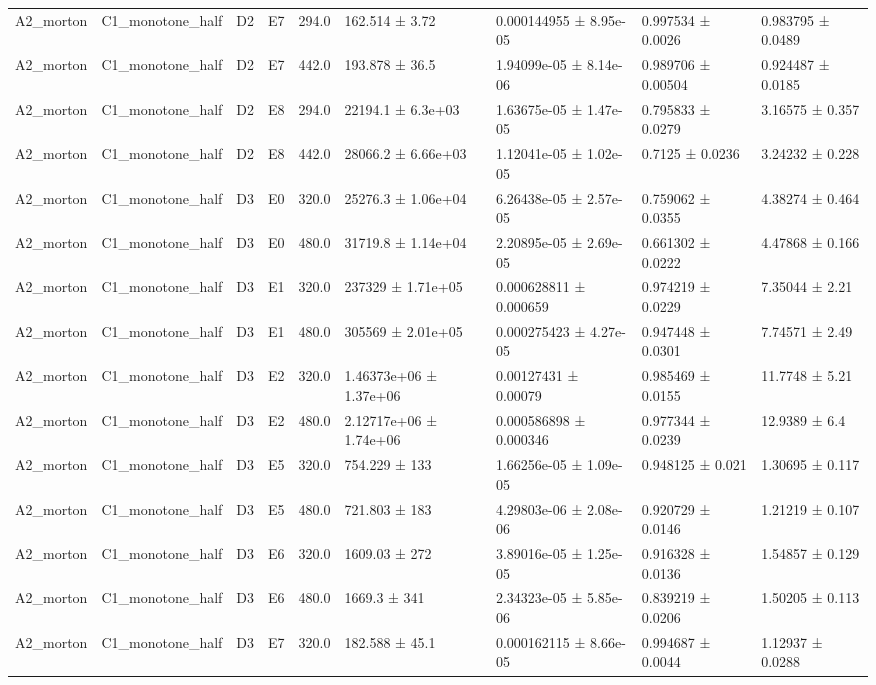 \begin{table}
\begin{tabular}{lllllllll}
A2\_morton & C1\_monotone\_half & D2 & E7 & 294.0 & 162.514 ± 3.72 & 0.000144955 ± 8.95e-05 & 0.997534 ± 0.0026 & 0.983795 ± 0.0489 \\
A2\_morton & C1\_monotone\_half & D2 & E7 & 442.0 & 193.878 ± 36.5 & 1.94099e-05 ± 8.14e-06 & 0.989706 ± 0.00504 & 0.924487 ± 0.0185 \\
A2\_morton & C1\_monotone\_half & D2 & E8 & 294.0 & 22194.1 ± 6.3e+03 & 1.63675e-05 ± 1.47e-05 & 0.795833 ± 0.0279 & 3.16575 ± 0.357 \\
A2\_morton & C1\_monotone\_half & D2 & E8 & 442.0 & 28066.2 ± 6.66e+03 & 1.12041e-05 ± 1.02e-05 & 0.7125 ± 0.0236 & 3.24232 ± 0.228 \\
A2\_morton & C1\_monotone\_half & D3 & E0 & 320.0 & 25276.3 ± 1.06e+04 & 6.26438e-05 ± 2.57e-05 & 0.759062 ± 0.0355 & 4.38274 ± 0.464 \\
A2\_morton & C1\_monotone\_half & D3 & E0 & 480.0 & 31719.8 ± 1.14e+04 & 2.20895e-05 ± 2.69e-05 & 0.661302 ± 0.0222 & 4.47868 ± 0.166 \\
A2\_morton & C1\_monotone\_half & D3 & E1 & 320.0 & 237329 ± 1.71e+05 & 0.000628811 ± 0.000659 & 0.974219 ± 0.0229 & 7.35044 ± 2.21 \\
A2\_morton & C1\_monotone\_half & D3 & E1 & 480.0 & 305569 ± 2.01e+05 & 0.000275423 ± 4.27e-05 & 0.947448 ± 0.0301 & 7.74571 ± 2.49 \\
A2\_morton & C1\_monotone\_half & D3 & E2 & 320.0 & 1.46373e+06 ± 1.37e+06 & 0.00127431 ± 0.00079 & 0.985469 ± 0.0155 & 11.7748 ± 5.21 \\
A2\_morton & C1\_monotone\_half & D3 & E2 & 480.0 & 2.12717e+06 ± 1.74e+06 & 0.000586898 ± 0.000346 & 0.977344 ± 0.0239 & 12.9389 ± 6.4 \\
A2\_morton & C1\_monotone\_half & D3 & E5 & 320.0 & 754.229 ± 133 & 1.66256e-05 ± 1.09e-05 & 0.948125 ± 0.021 & 1.30695 ± 0.117 \\
A2\_morton & C1\_monotone\_half & D3 & E5 & 480.0 & 721.803 ± 183 & 4.29803e-06 ± 2.08e-06 & 0.920729 ± 0.0146 & 1.21219 ± 0.107 \\
A2\_morton & C1\_monotone\_half & D3 & E6 & 320.0 & 1609.03 ± 272 & 3.89016e-05 ± 1.25e-05 & 0.916328 ± 0.0136 & 1.54857 ± 0.129 \\
A2\_morton & C1\_monotone\_half & D3 & E6 & 480.0 & 1669.3 ± 341 & 2.34323e-05 ± 5.85e-06 & 0.839219 ± 0.0206 & 1.50205 ± 0.113 \\
A2\_morton & C1\_monotone\_half & D3 & E7 & 320.0 & 182.588 ± 45.1 & 0.000162115 ± 8.66e-05 & 0.994687 ± 0.0044 & 1.12937 ± 0.0288 \\

\end{tabular}
\end{table}
